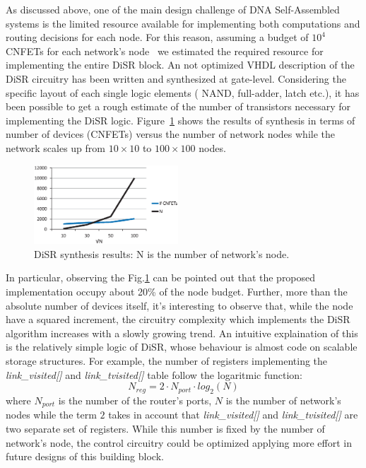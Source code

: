 As discussed above, one of the main design challenge of DNA
Self-Assembled systems is the limited resource available for
implementing both computations and routing decisions for each node.
For this reason, assuming a budget of $10^4$ CNFETs for each network's
node~\cite{liu_jetcs} we estimated the required resource for
implementing the entire DiSR block. An not optimized VHDL description
of the DiSR circuitry has been written and synthesized at gate-level.
Considering the specific layout of each single logic elements ( NAND,
full-adder, latch etc.), it has been possible to get a rough estimate
of the number of transistors necessary for implementing the DiSR
logic.  Figure~\ref{fig:imp_trend} shows the results of synthesis in
terms of number of devices (CNFETs) versus the number of network nodes
while the network scales up from $10\times10$ to $100\times100$ nodes.
\begin{figure}
  \centering
  \includegraphics[width=0.48\textwidth]{pictures/imp_rslt.eps}
  \caption{DiSR synthesis results: N is the number of network's node.}
 \label{fig:imp_trend}
\end{figure}
In particular, observing the Fig.\ref{fig:imp_trend} can 
be pointed out that the proposed implementation occupy  about 20\% of the node budget. 
Further, more than the absolute number of devices itself, it's interesting to
observe that, while the node have a squared increment, the circuitry
complexity which implements the DiSR algorithm increases with a slowly
growing trend.  
An intuitive explaination of this is the relatively simple logic of
DiSR, whose behaviour is almost code on scalable storage structures.
For example, the number of registers implementing the
\emph{link\_visited[]} and \emph{link\_tvisited[]} table follow the
logaritmic function:
\begin{equation}
  \label{eq:imp_trend}
  N_{reg}=2\cdot N_{port} \cdot log_2(N)
\end{equation}
where $N_{port}$ is the number of the router's ports, $N$ is the number 
of network's nodes while the term $2$ takes in account that \emph{link\_visited[]} and 
\emph{link\_tvisited[]} are two separate set of registers. While this number is fixed by 
the number of network's node, the control circuitry could be optimized applying more effort 
in future designs of this building block. 

